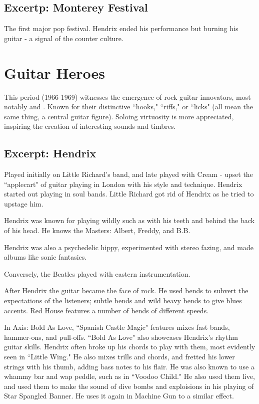 \documentclass[12pt, a4paper, twoside, openright, titlepage]{book}
\begin{document}
\subsection{Excertp: Monterey Festival}

The first major pop festival. Hendrix ended his performance but burning his guitar - a signal of the counter culture.


\section{Guitar Heroes}

This period (1966-1969) witnesses the emergence of rock guitar innovators, most notably  and . Known for their distinctive ``hooks," ``riffs," or ``licks" (all mean the same thing, a central guitar figure). Soloing virtuosity is more appreciated, inspiring the creation of interesting sounds and timbres.


\subsection{Excerpt: Hendrix}

Played initially on Little Richard's band, and late played with Cream - upset the ``applecart" of guitar playing in London with his style and technique. Hendrix started out playing in soul bands. Little Richard got rid of Hendrix as he tried to upstage him.

Hendrix was known for playing wildly such as with his teeth and behind the back of his head. He knows the Masters: Albert, Freddy, and B.B.

Hendrix was also a psychedelic hippy, experimented with stereo fazing, and made albums like sonic fantasies.


Conversely, the Beatles played with eastern instrumentation.

After Hendrix the guitar became the face of rock. He used bends to subvert the expectations of the listeners; subtle bends and wild heavy bends to give blues accents. Red House features a number of bends of different speeds.

In Axis: Bold As Love, ``Spanish Castle Magic" features mixes fast bands, hammer-ons, and pull-offs. ``Bold As Love" also showcases Hendrix's rhythm guitar skills. Hendrix often broke up his chords to play with them, most evidently seen in ``Little Wing." He also mixes trills and chords, and fretted his lower strings with his thumb, adding bass notes to his flair. He was also known to use a whammy bar and wap peddle, such as in ``Voodoo Child." He also used them live, and used them to make the sound of dive bombs and exploisions in his playing of Star Spangled Banner. He uses it again in Machine Gun to a similar effect.
\end{document}
